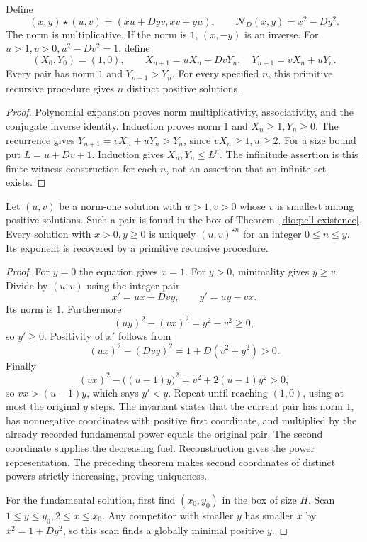 \begin{theorem}
\label{dio:pell-powers}
Define
\[
 (x,y)\mathbin{\star}(u,v)=(xu+Dyv,xv+yu),\qquad
 \mathcal N_D(x,y)=x^2-Dy^2.
\]
The norm is multiplicative. If the norm is $1$, $(x,-y)$ is an inverse.
For $u>1,v>0,u^2-Dv^2=1$, define
\[
 (X_0,Y_0)=(1,0),\qquad
 X_{n+1}=uX_n+DvY_n,\quad Y_{n+1}=vX_n+uY_n.
\]
Every pair has norm $1$ and $Y_{n+1}>Y_n$. For every specified $n$,
this primitive recursive procedure gives $n$ distinct positive solutions.
\end{theorem}
\begin{proof}
Polynomial expansion proves norm multiplicativity, associativity,
and the conjugate inverse identity. Induction proves norm $1$ and
$X_n\geq1,Y_n\geq0$. The recurrence gives
$Y_{n+1}=vX_n+uY_n>Y_n$, since $vX_n\geq1,u\geq2$.
For a size bound put $L=u+Dv+1$. Induction gives
$X_n,Y_n\leq L^n$. The infinitude assertion is this finite witness
construction for each $n$, not an assertion that an infinite set exists.
\end{proof}

\begin{theorem}
\label{dio:pell-all}
Let $(u,v)$ be a norm-one solution with $u>1,v>0$ whose $v$ is
smallest among positive solutions. Such a pair is found in the box of
Theorem~\ref{dio:pell-existence}. Every solution with $x>0,y\geq0$
is uniquely $(u,v)^{\star n}$ for an integer $0\leq n\leq y$.
Its exponent is recovered by a primitive recursive procedure.
\end{theorem}
\begin{proof}
For $y=0$ the equation gives $x=1$. For $y>0$, minimality gives
$y\geq v$. Divide by $(u,v)$ using the integer pair
\[
 x'=ux-Dvy,\qquad y'=uy-vx.
\]
Its norm is $1$. Furthermore
\[
 (uy)^2-(vx)^2=y^2-v^2\geq0,
\]
so $y'\geq0$. Positivity of $x'$ follows from
\[
 (ux)^2-(Dvy)^2=1+D(v^2+y^2)>0.
\]
Finally
\[
 (vx)^2-\bigl((u-1)y\bigr)^2=v^2+2(u-1)y^2>0,
\]
so $vx>(u-1)y$, which says $y'<y$.
Repeat until reaching $(1,0)$, using at most the original $y$ steps.
The invariant states that the current pair has norm $1$, has
nonnegative coordinates with positive first coordinate, and multiplied
by the already recorded fundamental power equals the original pair.
The second coordinate supplies the decreasing fuel.
Reconstruction gives the power representation.
The preceding theorem makes second coordinates of distinct powers
strictly increasing, proving uniqueness.

For the fundamental solution, first find $(x_0,y_0)$ in the box of size
$H$. Scan $1\leq y\leq y_0,2\leq x\leq x_0$.
Any competitor with smaller $y$ has smaller $x$ by $x^2=1+Dy^2$,
so this scan finds a globally minimal positive $y$.
\end{proof}

